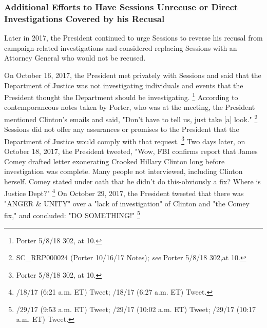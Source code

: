 {\subsubsection{Additional Efforts to Have Sessions Unrecuse or Direct Investigations Covered by his Recusal}

Later in 2017, the President continued to urge Sessions to reverse his recusal from campaign-related investigations and considered replacing Sessions with an Attorney General who would not be recused.

On October 16, 2017, the President met privately with Sessions and said that the Department of Justice was not investigating individuals and events that the President thought the Department should be investigating.%
\footnote{Porter 5/8/18 302, at 10.}
According to contemporaneous notes taken by Porter, who was at the meeting, the President mentioned Clinton's emails and said, "Don't have to tell us, just take [a] look."%
\footnote{SC\_RRP000024 (Porter 10/16/17 Notes);
\textit{see} Porter 5/8/18 302,at 10.}
Sessions did not offer any assurances or promises to the President that the Department of Justice would comply with that request.%
\footnote{Porter 5/8/18 302, at 10.}
Two days later, on October 18, 2017, the President tweeted, "Wow, FBI confirms report that James Comey drafted letter exonerating Crooked Hillary Clinton long before investigation was complete.
Many people not interviewed, including Clinton herself.
Comey stated under oath that he didn't do this-obviously a fix?
Where is Justice Dept?"%
\footnote{/18/17 (6:21 a.m. ET) Tweet;
/18/17 (6:27 a.m. ET) Tweet.}
On October 29, 2017, the President tweeted that there was "ANGER \& UNITY" over a "lack of investigation" of Clinton and "the Comey fix," and concluded: "DO SOMETHING!"%
\footnote{/29/17 (9:53 a.m. ET) Tweet;
/29/17 (10:02 a.m. ET) Tweet;
/29/17 (10:17 a.m. ET) Tweet.}

}

